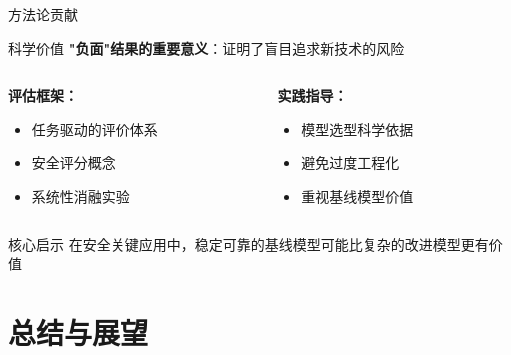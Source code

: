\documentclass[aspectratio=169]{beamer}
\begin{document}
\begin{frame}{方法论贡献}
    \begin{block}{科学价值}
        \textbf{"负面"结果的重要意义}：证明了盲目追求新技术的风险
    \end{block}
    
    \begin{columns}
        \begin{column}{0.5\textwidth}
            \textbf{评估框架：}
            \begin{itemize}
                \item 任务驱动的评价体系
                \item 安全评分概念
                \item 系统性消融实验
            \end{itemize}
        \end{column}
        \begin{column}{0.5\textwidth}
            \textbf{实践指导：}
            \begin{itemize}
                \item 模型选型科学依据
                \item 避免过度工程化
                \item 重视基线模型价值
            \end{itemize}
        \end{column}
    \end{columns}
    
    \begin{alertblock}{核心启示}
        在安全关键应用中，稳定可靠的基线模型可能比复杂的改进模型更有价值
    \end{alertblock}
\end{frame}

\section{总结与展望}
\end{document}
